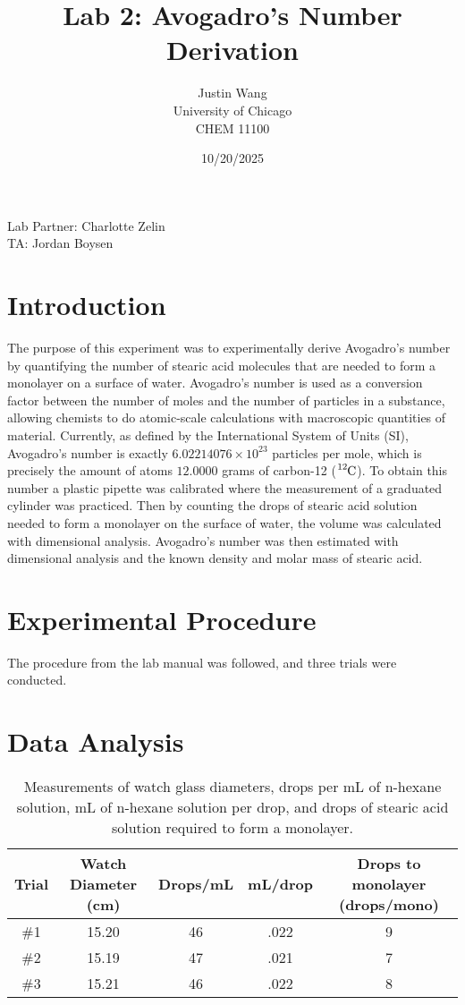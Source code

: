 \documentclass[11pt]{article}
\title{\textbf{Lab 2: Avogadro's Number Derivation}}
\author{Justin Wang\\ University of Chicago \\ CHEM 11100}
\date{10/20/2025}
\begin{document}
\maketitle

\begin{center}
    {\small Lab Partner: Charlotte Zelin} \\
    {\small TA: Jordan Boysen}
\end{center}
\section*{Introduction}
\hspace{2em} The purpose of this experiment was to experimentally derive Avogadro's number by quantifying the number of
stearic acid molecules that are needed to form a monolayer on a surface of water. Avogadro's number is used as a conversion
factor between the number of moles and the number of particles in a substance, allowing chemists to do atomic-scale calculations 
with macroscopic quantities of material. Currently, as defined by the International System of Units (SI), Avogadro's number is exactly
$6.02214076 \times 10^{23}$ particles per mole, which is precisely the amount of atoms $12.0000$ grams of carbon-12 ($\ce{^{12}C}$). 
To obtain this number a plastic pipette was calibrated where the measurement of a graduated cylinder was practiced. Then by counting the drops 
of stearic acid solution needed to form a monolayer on the surface of water, the volume was calculated with dimensional analysis. 
Avogadro's number was then estimated with dimensional analysis and the known density and molar mass of stearic acid.

\section*{Experimental Procedure}
The procedure from the lab manual was followed, and three trials were conducted. 

\section*{Data Analysis}
\begin{table}[h!]
\centering
\begin{tabular}{ccccc}
\toprule
Trial & Watch Diameter (\si{\centi\meter}) & Drops/mL & mL/drop & Drops to monolayer (drops/mono) \\
\midrule
\#1 & 15.20 & 46 & .022 & 9 \\
\#2 & 15.19 & 47 & .021 & 7 \\
\#3 & 15.21 & 46 & .022 & 8 \\
\bottomrule
\end{tabular}
\caption{Measurements of watch glass diameters, drops per mL of n-hexane solution, mL of n-hexane solution per drop, and drops of stearic acid solution required to form a monolayer.}
\label{tab:watch_measurements}
\end{table}
\newpage
\end{document}
